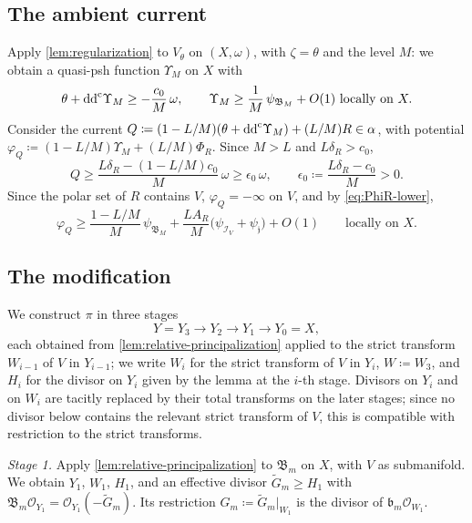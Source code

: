 \documentclass[11pt,a4paper]{amsart}
\theoremstyle{definition}
\begin{document}
\subsection{The ambient current}\label{sec:ambient}

Apply \cref{lem:regularization} to $V_\theta$ on $(X,\omega)$, with
$\zeta=\theta$ and the level $M$: we obtain a quasi-psh function $\Upsilon_M$ on
$X$ with
\[
  \theta+\mathrm{dd}^{\mathrm{c}} \Upsilon_M\ge-\frac{c_0}M\,\omega,\qquad
  \Upsilon_M\ge\frac1M\,\psi_{\mathfrak B_M}+O(1)\ \text{locally on }X.
\]
Consider the current
$Q\coloneqq (1-L/M)(\theta+\mathrm{dd}^{\mathrm{c}} \Upsilon_M)+(L/M)R\in\alpha$, with potential
$\varphi_Q\coloneqq (1-L/M)\Upsilon_M+(L/M)\Phi_R$. Since $M>L$ and
$L\delta_R>c_0$,
\begin{equation}\label{eq:QM-positivity}
  Q\ge\frac{L\delta_R-(1-L/M)c_0}M\,\omega\ge\epsilon_0\,\omega,
  \qquad \epsilon_0\coloneqq \frac{L\delta_R-c_0}M>0 .
\end{equation}
Since the polar set of $R$ contains $V$, $\varphi_Q=-\infty$ on $V$, and
by \eqref{eq:PhiR-lower},
\begin{equation}\label{eq:phiQ-lower}
  \varphi_Q\ge\frac{1-L/M}M\,\psi_{\mathfrak B_M}
   +\frac{LA_R}M\bigl(\psi_{\mathcal I_V}+\psi_{\mathfrak j}\bigr)+O(1)
   \qquad\text{locally on }X.
\end{equation}

\subsection{The modification}\label{sec:modification}

We construct $\pi$ in three stages
\[
  Y=Y_3\longrightarrow Y_2\longrightarrow Y_1\longrightarrow Y_0=X,
\]
each obtained from \cref{lem:relative-principalization} applied to the
strict transform $W_{i-1}$ of $V$ in $Y_{i-1}$; we write $W_i$ for the
strict transform of $V$ in $Y_i$, $W\coloneqq W_3$, and $H_i$ for the
divisor on $Y_i$ given by the lemma at the $i$-th stage. Divisors on
$Y_i$ and on $W_i$ are tacitly replaced by their total transforms on the
later stages; since no divisor below contains the relevant strict
transform of $V$, this is compatible with restriction to the strict
transforms.

\emph{Stage 1.} Apply \cref{lem:relative-principalization} to
$\mathfrak B_m$ on $X$, with $V$ as submanifold. We obtain $Y_1$, $W_1$,
$H_1$, and an effective divisor $\widetilde G_m\ge H_1$ with
$\mathfrak B_m\mathcal O_{Y_1}=\mathcal O_{Y_1}(-\widetilde G_m)$. Its
restriction $G_m\coloneqq \widetilde G_m|_{W_1}$ is the divisor of
$\mathfrak b_m\mathcal O_{W_1}$.
\end{document}
